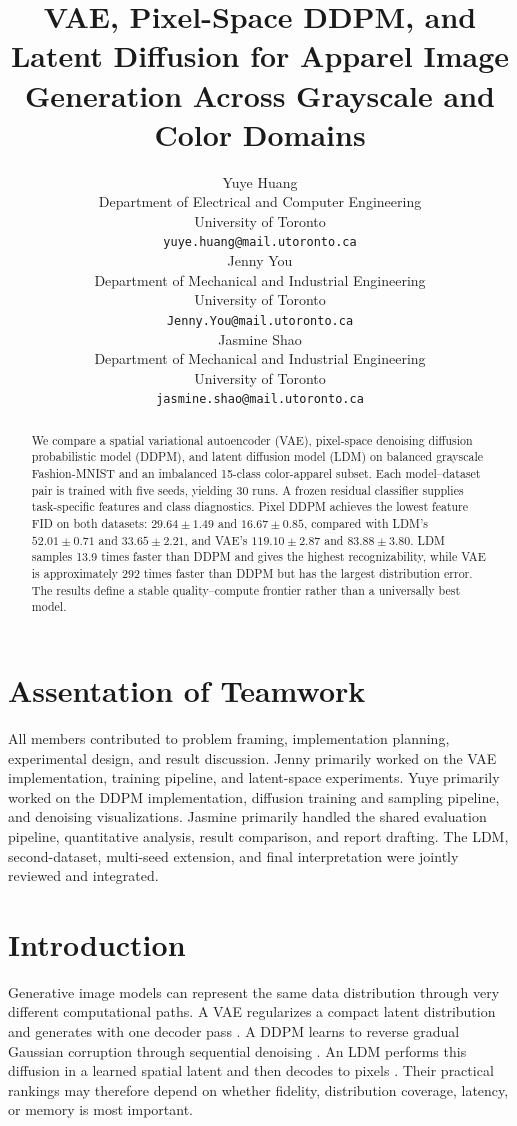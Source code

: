 \documentclass{article}
\title{VAE, Pixel-Space DDPM, and Latent Diffusion for Apparel Image Generation Across Grayscale and Color Domains}
\author{%
  Yuye Huang\\
  Department of Electrical and Computer Engineering\\
  University of Toronto\\
  \texttt{yuye.huang@mail.utoronto.ca} \\
  \And
  Jenny You\\
  Department of Mechanical and Industrial Engineering\\
  University of Toronto\\
  \texttt{Jenny.You@mail.utoronto.ca} \\
  \And
  Jasmine Shao\\
  Department of Mechanical and Industrial Engineering\\
  University of Toronto\\
  \texttt{jasmine.shao@mail.utoronto.ca} \\
}
\begin{document}
\maketitle

\begin{abstract}
We compare a spatial variational autoencoder (VAE), pixel-space denoising diffusion probabilistic model (DDPM), and latent diffusion model (LDM) on balanced grayscale Fashion-MNIST and an imbalanced 15-class color-apparel subset. Each model--dataset pair is trained with five seeds, yielding 30 runs. A frozen residual classifier supplies task-specific features and class diagnostics. Pixel DDPM achieves the lowest feature FID on both datasets: $29.64\pm1.49$ and $16.67\pm0.85$, compared with LDM's $52.01\pm0.71$ and $33.65\pm2.21$, and VAE's $119.10\pm2.87$ and $83.88\pm3.80$. LDM samples 13.9 times faster than DDPM and gives the highest recognizability, while VAE is approximately 292 times faster than DDPM but has the largest distribution error. The results define a stable quality--compute frontier rather than a universally best model.
\end{abstract}

\section*{Assentation of Teamwork}
All members contributed to problem framing, implementation planning, experimental design, and result discussion. Jenny primarily worked on the VAE implementation, training pipeline, and latent-space experiments. Yuye primarily worked on the DDPM implementation, diffusion training and sampling pipeline, and denoising visualizations. Jasmine primarily handled the shared evaluation pipeline, quantitative analysis, result comparison, and report drafting. The LDM, second-dataset, multi-seed extension, and final interpretation were jointly reviewed and integrated.

\section{Introduction}
Generative image models can represent the same data distribution through very different computational paths. A VAE regularizes a compact latent distribution and generates with one decoder pass \citep{kingma2014vae}. A DDPM learns to reverse gradual Gaussian corruption through sequential denoising \citep{ho2020ddpm}. An LDM performs this diffusion in a learned spatial latent and then decodes to pixels \citep{rombach2022ldm}. Their practical rankings may therefore depend on whether fidelity, distribution coverage, latency, or memory is most important.
\end{document}

